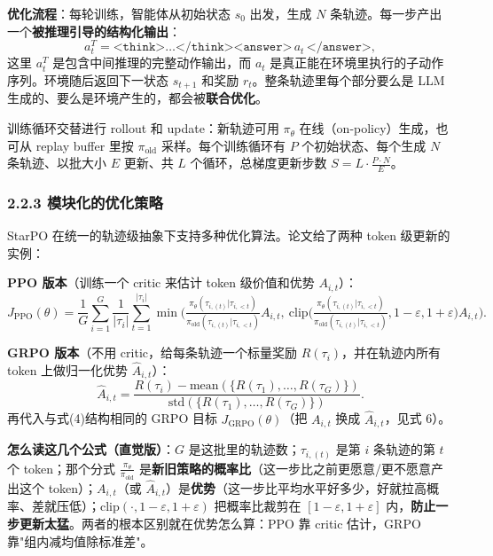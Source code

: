 \documentclass[11pt,UTF8,fontset=fandol]{ctexart}
\begin{document}
\textbf{优化流程}：每轮训练，智能体从初始状态 $s_0$ 出发，生成 $N$ 条轨迹。每一步产出一个\textbf{被推理引导的结构化输出}：
\begin{equation*}
a^T_t=\texttt{<think>}\dots\texttt{</think>}\texttt{<answer>}\,a_t\,\texttt{</answer>},\tag{3}
\end{equation*}
这里 $a^T_t$ 是包含中间推理的完整动作输出，而 $a_t$ 是真正能在环境里执行的子动作序列。环境随后返回下一状态 $s_{t+1}$ 和奖励 $r_t$。整条轨迹里每个部分要么是 LLM 生成的、要么是环境产生的，都会被\textbf{联合优化}。

训练循环交替进行 rollout 和 update：新轨迹可用 $\pi_\theta$ 在线（on-policy）生成，也可从 replay buffer 里按 $\pi_{\text{old}}$ 采样。每个训练循环有 $P$ 个初始状态、每个生成 $N$ 条轨迹、以批大小 $E$ 更新、共 $L$ 个循环，总梯度更新步数 $S=L\cdot\frac{P\cdot N}{E}$。

\subsubsection{2.2.3 模块化的优化策略}

StarPO 在统一的轨迹级抽象下支持多种优化算法。论文给了两种 token 级更新的实例：

\textbf{PPO 版本}（训练一个 critic 来估计 token 级价值和优势 $A_{i,t}$）：
\begin{equation*}
J_{\text{PPO}}(\theta)=\frac{1}{G}\sum_{i=1}^{G}\frac{1}{|\tau_i|}\sum_{t=1}^{|\tau_i|}\min\!\Big(\tfrac{\pi_\theta(\tau_{i,(t)}|\tau_{i,<t})}{\pi_{\text{old}}(\tau_{i,(t)}|\tau_{i,<t})}A_{i,t},\ \text{clip}\big(\tfrac{\pi_\theta(\tau_{i,(t)}|\tau_{i,<t})}{\pi_{\text{old}}(\tau_{i,(t)}|\tau_{i,<t})},1-\varepsilon,1+\varepsilon\big)A_{i,t}\Big).\tag{4}
\end{equation*}

\textbf{GRPO 版本}（不用 critic，给每条轨迹一个标量奖励 $R(\tau_i)$，并在轨迹内所有 token 上做归一化优势 $\hat{A}_{i,t}$）：
\begin{equation*}
\hat{A}_{i,t}=\frac{R(\tau_i)-\text{mean}(\{R(\tau_1),\dots,R(\tau_G)\})}{\text{std}(\{R(\tau_1),\dots,R(\tau_G)\})}.\tag{5}
\end{equation*}
再代入与式(4)结构相同的 GRPO 目标 $J_{\text{GRPO}}(\theta)$（把 $A_{i,t}$ 换成 $\hat{A}_{i,t}$，见式 6）。

\textbf{怎么读这几个公式（直觉版）}：$G$ 是这批里的轨迹数；$\tau_{i,(t)}$ 是第 $i$ 条轨迹的第 $t$ 个 token；那个分式 $\frac{\pi_\theta}{\pi_{\text{old}}}$ 是\textbf{新旧策略的概率比}（这一步比之前更愿意/更不愿意产出这个 token）；$A_{i,t}$（或 $\hat A_{i,t}$）是\textbf{优势}（这一步比平均水平好多少，好就拉高概率、差就压低）；$\text{clip}(\cdot,1-\varepsilon,1+\varepsilon)$ 把概率比裁剪在 $[1-\varepsilon,1+\varepsilon]$ 内，\textbf{防止一步更新太猛}。两者的根本区别就在优势怎么算：PPO 靠 critic 估计，GRPO 靠"组内减均值除标准差"。
\end{document}

